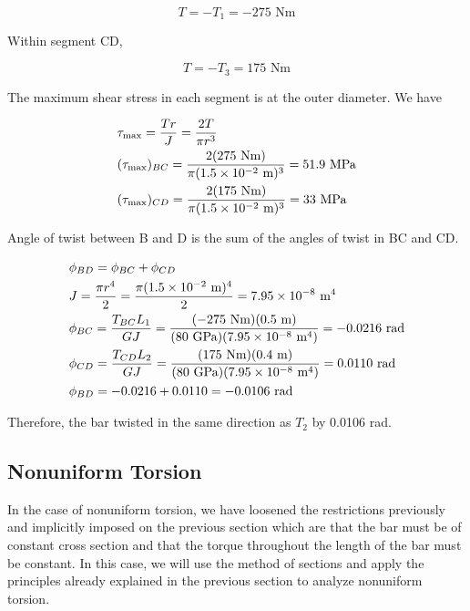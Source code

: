 \documentclass[a4paper,openany,12pt]{book}
\begin{document}
$$T =  - T_1 =  - 275\text{ Nm}$$

Within segment CD,

$$T =  - T_3 = 175\text{ Nm}$$

The maximum shear stress in each segment is at the outer diameter. We
have

$$\begin{gathered}
  \tau _{\max } = \frac{Tr}{J} = \frac{2T}{\pi r^3} \hfill \\
  (\tau _{\max })_{BC} = \frac{2(275\text{ Nm})}{\pi (1.5 \times 10^{ - 2}\text{ m})^3} = 51.9\text{ MPa} \hfill \\
  (\tau _{\max })_{CD} = \frac{2(175\text{ Nm})}{\pi (1.5 \times 10^{ - 2}\text{ m})^3} = 33\text{ MPa} \hfill \\ 
\end{gathered}$$

Angle of twist between B and D is the sum of the angles of twist in BC
and CD.

$$\begin{gathered}
  \phi_{BD} = \phi _{BC} + \phi _{CD} \hfill \\
  J = \frac{\pi r^4}{2} = \frac{\pi (1.5 \times 10^{ - 2} \text{ m})^4}{2} =
  7.95 \times 10^{ - 8} \text{ m}^4 \hfill \\
  \phi_{BC} = \frac{T_{BC}L_1}{GJ} = \frac{( - 275\text{ Nm})(0.5\text{ m})}{(80\text{ GPa})(7.95 \times 10^{-8}\text{ m}^4)} =  - 0.0216\text{ rad} \hfill \\
  \phi_{CD} = \frac{T_{CD}L_2}{GJ} = \frac{(175\text{ Nm})(0.4\text{ m})}{(80\text{ GPa})(7.95 \times 10^{-8}\text{ m}^4)} = 0.0110\text{ rad} \hfill \\
  \phi_{BD} =  - 0.0216 + 0.0110 =  - 0.0106\text{ rad} \hfill \\ 
\end{gathered}$$

Therefore, the bar twisted in the same direction as \(T_2\) by 0.0106 rad.

\subsection{Nonuniform Torsion}
\label{nonuniform-torsion}
In the case of nonuniform torsion, we have loosened the restrictions
previously and implicitly imposed on the previous section which are that
the bar must be of constant cross section and that the torque throughout
the length of the bar must be constant. In this case, we will use the
method of sections and apply the principles already explained in the
previous section to analyze nonuniform torsion.
\end{document}
